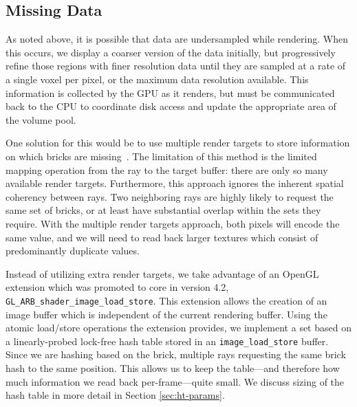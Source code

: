 

\subsection{Missing Data}

As noted above, it is possible that data are undersampled while
rendering.  When this occurs, we display a coarser version of the data
initially, but progressively refine those regions with finer resolution
data until they are sampled at a rate of a single voxel per pixel, or
the maximum data resolution available.  This information is collected
by the GPU as it renders, but must be communicated back to the CPU to
coordinate disk access and update the appropriate area of the volume
pool.

One solution for this would be to use multiple render targets to store
information on which bricks are missing~\cite{Crassin:2009:Gigavoxels}.
The limitation of this method is the limited mapping operation from
the ray to the target buffer: there are only so many available render
targets.
Furthermore, this approach ignores the inherent spatial coherency
between rays.  Two neighboring rays are highly likely to request the
same set of bricks, or at least have substantial overlap within the
sets they require.  With the multiple render targets approach, both
pixels will encode the same value, and we will need to read back larger
textures which consist of predominantly duplicate values.

Instead of utilizing extra render targets, we take advantage of an
OpenGL extension which was promoted to core in version 4.2,
\texttt{GL\_ARB\_shader\_image\_load\_store}.  This extension allows
the creation of an image buffer which is independent of the current
rendering buffer.  Using the atomic load/store operations the extension
provides, we implement a set based on a linearly-probed lock-free hash
table stored in an \texttt{image\_load\_store} buffer.  Since we are
hashing based on the brick, multiple rays requesting the same brick hash
to the same position.  This allows us to keep the table---and therefore
how much information we read back per-frame---quite small.  We discuss
sizing of the hash table in more detail in
Section \ref{sec:ht-params}.

